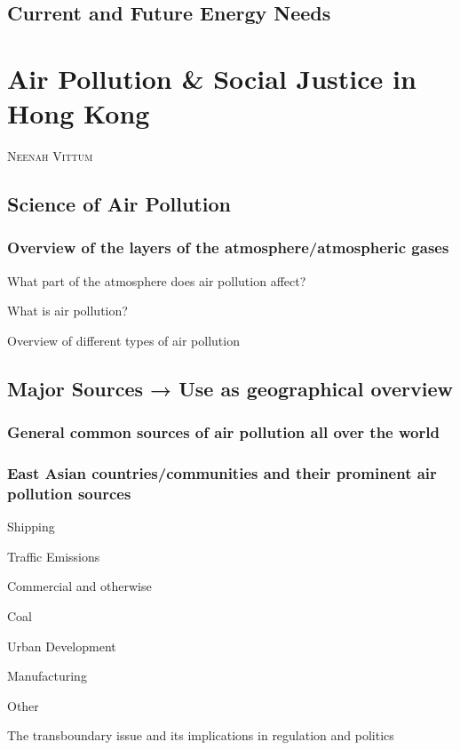 \documentclass{book}\usepackage{knitr}
\makeatletter
\newcommand{\chapterauthor}[1]{%
  {\parindent0pt\vspace*{-25pt}%
  \linespread{1.1}\large\scshape#1%
  \par\nobreak\vspace*{35pt}}
  \@afterheading%
}
\makeatother
\begin{document}
\section{Current and Future Energy Needs}



\chapter{Air Pollution \& Social Justice in Hong Kong}

\chapterauthor{Neenah Vittum}

\section{Science of Air Pollution}

\subsection{Overview of the layers of the atmosphere/atmospheric gases}

What part of the atmosphere does air pollution affect?

What is air pollution?

Overview of different types of air pollution

\section{Major Sources → Use as geographical overview}

\subsection{General common sources of air pollution all over the world}

\subsection{East Asian countries/communities and their prominent air pollution sources}

Shipping

Traffic Emissions

Commercial and otherwise

Coal

Urban Development

Manufacturing

Other

The transboundary issue and its implications in regulation and politics
\end{document}
